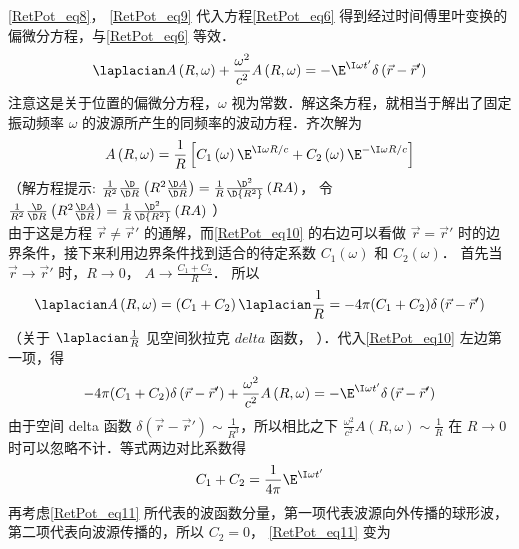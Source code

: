 \autoref{RetPot_eq8}， \autoref{RetPot_eq9} 代入方程\autoref{RetPot_eq6} 得到经过时间傅里叶变换的偏微分方程，与\autoref{RetPot_eq6} 等效． 
\begin{equation}\label{RetPot_eq10}
{\laplacian}A\left( {R,\omega } \right) + \frac{\omega ^2}{c^2}A\left( {R,\omega } \right) =  - {\E^{\I\omega t'}}\delta \left( {\vec r - \vec r'} \right)
\end{equation} 
注意这是关于位置的偏微分方程，$\omega$ 视为常数．解这条方程，就相当于解出了固定振动频率 $\omega$ 的波源所产生的同频率的波动方程．齐次解为
\begin{equation}\label{RetPot_eq11}
A\left( {R,\omega } \right) = \frac{1}{R}\left[ {{C_1}\left( \omega  \right){\E^{\I\omega R/c}} + {C_2}\left( \omega  \right){\E^{ -\I\omega R/c}}} \right]
\end{equation} 
（解方程提示: $\frac{1}{{{R^2}}}\frac{\D }{{\D R}}\left( {{R^2}\frac{{\D A}}{{\D R}}} \right) = \frac{1}{R}\frac{{{\D ^2}}}{{\D {R^2}}}\left( {RA} \right)$， 令 $\frac{1}{{{R^2}}}\frac{\D }{{\D R}}\left( {{R^2}\frac{{\D A}}{{\D R}}} \right) = \frac{1}{R}\frac{{{\D ^2}}}{{\D {R^2}}}\left( {RA} \right)$ ）\\
由于这是方程 $\vec r \ne \vec r'$ 的通解，而\autoref{RetPot_eq10} 的右边可以看做 $\vec r = \vec r'$ 时的边界条件，接下来利用边界条件找到适合的待定系数 ${C_1}\left( \omega  \right)$ 和 ${C_2}\left( \omega  \right)$．  
首先当 $\vec r \to \vec r'$ 时，$R \to 0$， $A \to \frac{{{C_1} + {C_2}}}{R}$． 所以
\begin{equation}
{\laplacian}A\left( {R,\omega } \right) = \left( {{C_1} + {C_2}} \right){\laplacian}\frac{1}{R} =  - 4\pi ({C_1} + {C_2})\delta \left( {\vec r - \vec r'} \right)
\end{equation} 
（关于 ${\laplacian}\frac{1}{R}$ 见空间狄拉克 $delta$ 函数，%
）．代入\autoref{RetPot_eq10} 左边第一项，得
\begin{equation}
 - 4\pi ({C_1} + {C_2})\delta \left( {\vec r - \vec r'} \right) + \frac{\omega ^2}{c^2}A\left( {R,\omega } \right) =  - {\E^{\I\omega t'}}\delta \left( {\vec r - \vec r'} \right)
\end{equation} 
由于空间 delta 函数 $\delta \left( {\vec r - \vec r'} \right) \sim \frac{1}{{{R^3}}}$，所以相比之下 $\frac{{{\omega ^2}}}{{{c^2}}}A\left( {R,\omega } \right) \sim \frac{1}{R}$ 在 $R \to 0$ 时可以忽略不计．等式两边对比系数得
\begin{equation}
{C_1} + {C_2} = \frac{1}{4\pi }{\E^{\I\omega t'}}
\end{equation} 
再考虑\autoref{RetPot_eq11} 所代表的波函数分量，第一项代表波源向外传播的球形波，第二项代表向波源传播的，所以 ${C_2} = 0$， \autoref{RetPot_eq11} 变为
